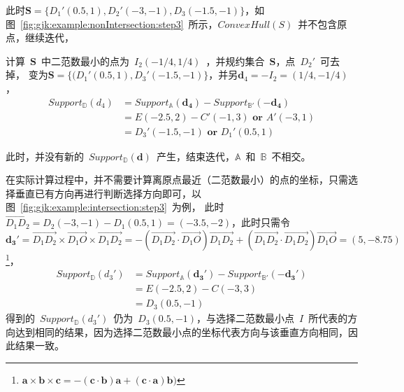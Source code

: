 此时$\bm{S} = \{D_1'(0.5, 1), D_2'(-3, -1), D_3(-1.5, -1)\}$，如图~\ref{fig:gjk:example:nonIntersection:step3}~所示，$ConvexHull(S)$~并不包含原点，继续迭代，

计算~$\bm{S}$~中二范数最小的点为~$I_2(-1/4, 1/4)$~，并规约集合~$\bm{S}$，点~$D_2'$~可去掉，
变为$\bm{S} = \{ (D_1'(0.5, 1), D_3'(-1.5, -1)\}$，并另$\bm{d}_4 = -I_2 = (1/4, -1/4)$，
\begin{equation}
  \begin{array}{ll}
  Support_\mathbb{D}(d_4)  & = Support_\mathbb{A}(\bm{d_4}) - Support_\mathbb{B'}(-\bm{d_4}) \\
    & = E(-2.5, 2) - C'(-1, 3) \textbf{~or~} A'(-3, 1)  \\
    & = D_3'(-1.5, -1) \textbf{~or~} D_1'(0.5, 1)
  \end{array}
  \label{euqa:gjk:non:step4}
\end{equation}

此时，并没有新的~$Support_\mathbb{D}(\bm{d})$~产生，结束迭代，$\mathbb{A}$~和~$\mathbb{B}$~不相交。

在实际计算过程中，并不需要计算离原点最近（二范数最小）的点的坐标，只需选择垂直已有方向再进行判断选择方向即可，以图~\ref{fig:gjk:example:intersection:step3}~为例，
此时~$\overrightarrow{D_1D_2} = D_2(-3, -1) - D_1(0.5, 1) = (-3.5, -2)$，此时只需令~
$\bm{d_3'} = \overrightarrow{D_1D_2} \times \overrightarrow{D_1O} \times \overrightarrow{D_1D_2} = -(\overrightarrow{D_1D_2} \cdot \overrightarrow{D_1O})\overrightarrow{D_1D_2} +
(\overrightarrow{D_1D_2} \cdot \overrightarrow{D_1D_2})\overrightarrow{D_1O} = (5,-8.75)$
\footnote{$\bm{a} \times \bm{b} \times \bm{c} = -(\bm{c}\cdot\bm{b})\bm{a}+(\bm{c}\cdot\bm{a})\bm{b})$}，
\begin{equation}
  \begin{array}{ll}
  Support_\mathbb{D}(d_3')  & = Support_\mathbb{A}(\bm{d_3'}) - Support_\mathbb{B'}(-\bm{d_3'}) \\
    & = E(-2.5, 2) - C(-3, 3) \\
    & = D_3(0.5, -1) 
  \end{array}
\end{equation}
得到的~$Support_\mathbb{D}(d_3')$~仍为~$D_3(0.5,-1)$，与选择二范数最小点~$I$~所代表的方向达到相同的结果，因为选择二范数最小点的坐标代表方向与该垂直方向相同，因此结果一致。

